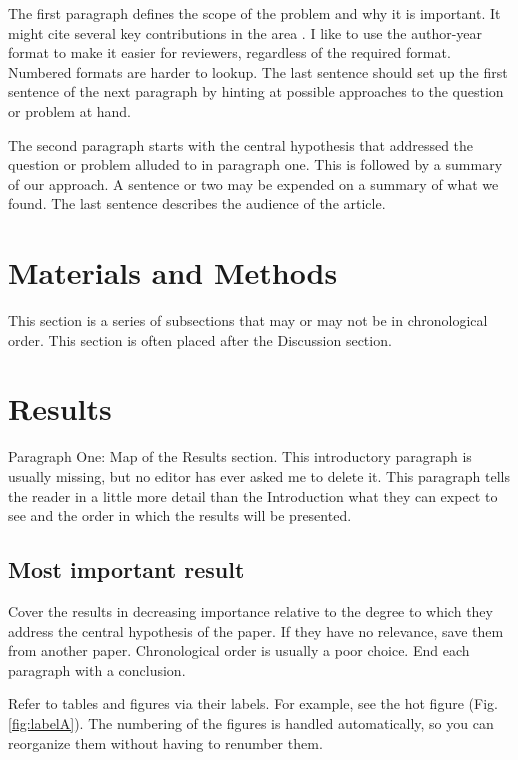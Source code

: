 \documentclass[11pt,letterpaper]{article}
\begin{document}
The first paragraph defines the scope of the problem and why it is important.
It might cite several key contributions in the area \cite{Acharya2011SolvingProbabilisticProgrammingProblemsInvolvingMultiChoiceParameters, Luft2007EfficientOptimizationOfCrystallizationConditionsByManipulationOfDropVolumeRatioAndTemperature}.
I like to use the author-year format to make it easier for reviewers, regardless of the required format.
Numbered formats are harder to lookup.
The last sentence should set up the first sentence of the next paragraph by hinting at possible approaches to the question or problem at hand.

The second paragraph starts with the central hypothesis that addressed the question or problem alluded to in paragraph one.
This is followed by a summary of our approach.
A sentence or two may be expended on a summary of what we found.
The last sentence describes the audience of the article.



\section*{Materials and Methods}
\label{sec:orgacf3670}

This section is a series of subsections that may or may not be in chronological order.
This section is often placed after the Discussion section.

\section*{Results}
\label{sec:orgdd6907d}

Paragraph One: Map of the Results section.
This introductory paragraph is usually missing, but no editor has ever asked me to delete it.
This paragraph tells the reader in a little more detail than the Introduction what they can expect to see and the order in which the results will be presented.


\subsection*{Most important result}
\label{sec:org3a98628}
Cover the results in decreasing importance relative to the degree to which they address the central hypothesis of the paper.
If they have no relevance, save them from another paper.
Chronological order is usually a poor choice.
End each paragraph with a conclusion.

Refer to tables and figures via their labels.
For example, see the hot figure (Fig. \ref{fig:labelA}).
The numbering of the figures is handled automatically, so you can reorganize them without having to renumber them.
\end{document}
